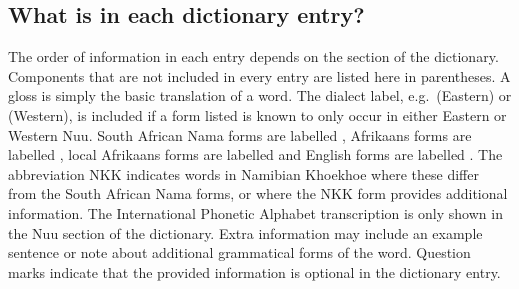 \markboth{}{}
\addtocounter{subsection}{-1}
\tocless\subsection{What is in each dictionary entry?}
{}
\label{s:watisin_e}
\markboth{}{}

The order of information in each entry depends on the section of the
dictionary. Components that are not included in every entry are listed
here in parentheses. A gloss is simply the basic translation of a
word. The dialect label, e.g.\ (Eastern) or (Western), is included if
a form listed is known to only occur in either Eastern or Western
N\textipa{\textvertline}uu. South African Nama forms are labelled
, Afrikaans forms are labelled , local
Afrikaans forms are labelled
 and English forms are
labelled . The abbreviation NKK indicates words in
Namibian Khoekhoe where these differ from the South African Nama
forms, or where the NKK form provides additional information. The
International Phonetic Alphabet transcription is only shown in the
N\textipa{\textvertline}uu section of the dictionary. Extra
information may include an example sentence or note about additional
grammatical forms of the word.  Question marks indicate that the
provided information is optional in the dictionary entry. 

